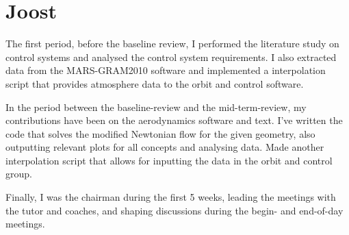 \section{Joost}

The first period, before the baseline review, I performed the literature study on control systems and analysed the control system requirements. I also extracted data from the MARS-GRAM2010 software and implemented a interpolation script that provides atmosphere data to the orbit and control software.

In the period between the baseline-review and the mid-term-review, my contributions have been on the aerodynamics software and text. I've written the code that solves the modified Newtonian flow for the given geometry, also outputting relevant plots for all concepts and analysing data. Made another interpolation script that allows for inputting the data in the orbit and control group.

Finally, I was the chairman during the first 5 weeks, leading the meetings with the tutor and coaches, and shaping discussions during the begin- and end-of-day meetings.